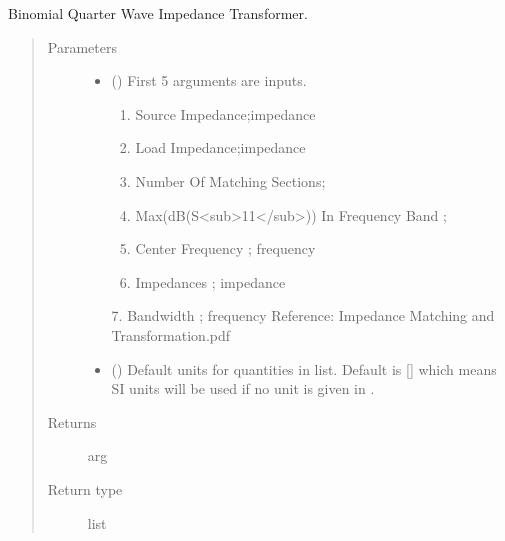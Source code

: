 \documentclass[letterpaper,10pt,english]{sphinxmanual}
\begin{document}

\begin{fulllineitems}
\label{\detokenize{components:components.Binomial_QWave_Impedance_Transformer}}
Binomial Quarter Wave Impedance Transformer.
\begin{quote}\begin{description}
\item[{Parameters}] \leavevmode\begin{itemize}
\item {} 
 () \textendash{} 
First 5 arguments are inputs.
\begin{enumerate}
%
\item {} 
Source Impedance;impedance

\item {} 
Load Impedance;impedance

\item {} 
Number Of Matching Sections;

\item {} 
Max(dB(S\textless{}sub\textgreater{}11\textless{}/sub\textgreater{})) In Frequency Band ;

\item {} 
Center Frequency ; frequency

\item {} 
Impedances ; impedance

\end{enumerate}

7.  Bandwidth ; frequency
Reference:  Impedance Matching and Transformation.pdf


\item {} 
 (\sphinxstyleliteralemphasis{\sphinxupquote{, }}) \textendash{} Default units for quantities in  list. Default is {[}{]} which means SI units will be used if no unit is given in .

\end{itemize}

\item[{Returns}] \leavevmode
arg

\item[{Return type}] \leavevmode
list

\end{description}\end{quote}

\end{fulllineitems}
\end{document}
